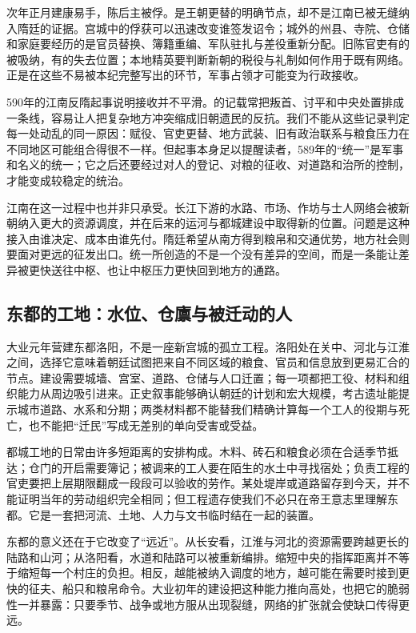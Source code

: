 次年正月建康易手，陈后主被俘。是王朝更替的明确节点，却不是江南已被无缝纳入隋廷的证据。宫城中的俘获可以迅速改变谁签发诏令；城外的州县、寺院、仓储和家庭要经历的是官员替换、簿籍重编、军队驻扎与差役重新分配。旧陈官吏有的被吸纳，有的失去位置；本地精英要判断新朝的税役与礼制如何作用于既有网络。正是在这些不易被本纪完整写出的环节，军事占领才可能变为行政接收。

590年的江南反隋起事说明接收并不平滑。的记载常把叛首、讨平和中央处置排成一条线，容易让人把复杂地方冲突缩成旧朝遗民的反抗。我们不能从这些记录判定每一处动乱的同一原因：赋役、官吏更替、地方武装、旧有政治联系与粮食压力在不同地区可能组合得很不一样。但起事本身足以提醒读者，589年的“统一”是军事和名义的统一；它之后还要经过对人的登记、对粮的征收、对道路和治所的控制，才能变成较稳定的统治。

江南在这一过程中也并非只承受。长江下游的水路、市场、作坊与士人网络会被新朝纳入更大的资源调度，并在后来的运河与都城建设中取得新的位置。问题是这种接入由谁决定、成本由谁先付。隋廷希望从南方得到粮帛和交通优势，地方社会则要面对更远的征发出口。统一所创造的不是一个没有差异的空间，而是一条能让差异被更快送往中枢、也让中枢压力更快回到地方的通路。

\subsection{东都的工地：水位、仓廪与被迁动的人}
大业元年营建东都洛阳，不是一座新宫城的孤立工程。洛阳处在关中、河北与江淮之间，选择它意味着朝廷试图把来自不同区域的粮食、官员和信息放到更易汇合的节点。建设需要城墙、宫室、道路、仓储与人口迁置；每一项都把工役、材料和组织能力从周边吸引进来。正史叙事能够确认朝廷的计划和宏大规模，考古遗址能提示城市道路、水系和分期；两类材料都不能替我们精确计算每一个工人的役期与死亡，也不能把“迁民”写成无差别的单向受害或受益。

都城工地的日常由许多短距离的安排构成。木料、砖石和粮食必须在合适季节抵达；仓门的开启需要簿记；被调来的工人要在陌生的水土中寻找宿处；负责工程的官吏要把上层期限翻成一段段可以验收的劳作。某处堤岸或道路留存到今天，并不能证明当年的劳动组织完全相同；但工程遗存使我们不必只在帝王意志里理解东都。它是一套把河流、土地、人力与文书临时结在一起的装置。

东都的意义还在于它改变了“远近”。从长安看，江淮与河北的资源需要跨越更长的陆路和山河；从洛阳看，水道和陆路可以被重新编排。缩短中央的指挥距离并不等于缩短每一个村庄的负担。相反，越能被纳入调度的地方，越可能在需要时接到更快的征夫、船只和粮帛命令。大业初年的建设把这种能力推向高处，也把它的脆弱性一并暴露：只要季节、战争或地方服从出现裂缝，网络的扩张就会使缺口传得更远。

